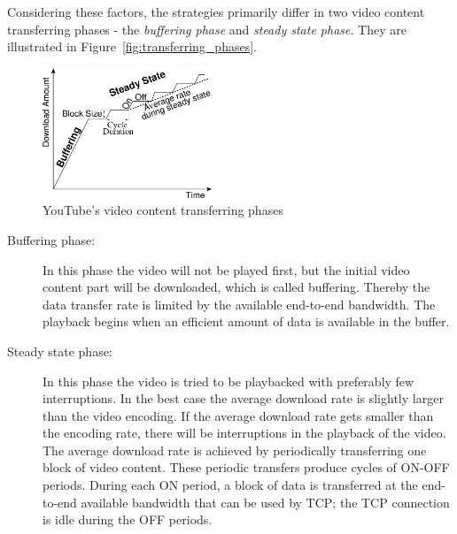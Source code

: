 Considering these factors, the strategies primarily differ in two video content transferring phases - the \emph{buffering phase} and \emph{steady state phase}. They are illustrated in Figure~\vref{fig:transferring_phases}.\\

\begin{figure}[htbp]
  \begin{minipage}{\textwidth}
    \begin{center}
      \includegraphics[width=0.45\textwidth]{pictures/transferring_phases.png}
      \caption[YouTube's video content transferring phases]{YouTube's video content transferring phases\footnotemark[2]}
    \label{fig:transferring_phases}
    \end{center}
  \end{minipage}
\end{figure}

\setlength{\skip\footins}{0cm} %
\setlength{\skip\footins}{1cm} %

\begin{description}
  \item[Buffering phase:] In this phase the video will not be played first, but the initial video content part will be downloaded, which is called buffering. Thereby the data transfer rate is limited by the available end-to-end bandwidth. The playback begins when an efficient amount of data is available in the buffer.

  \item[Steady state phase:] In this phase the video is tried to be playbacked with preferably few interruptions. In the best case the average download rate is slightly larger than the video encoding. If the average download rate gets smaller than the encoding rate, there will be interruptions in the playback of the video. The average download rate is achieved by periodically transferring one block of video content. These periodic transfers produce cycles of ON-OFF periods. During each ON period, a block of data is transferred at the end-to-end available bandwidth that can be used by TCP; the TCP connection is idle during the OFF periods.
\end{description}

